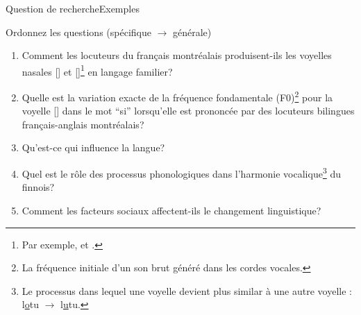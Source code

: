 \documentclass[xcolor=dvipsnames, mathserif, 10pt, aspectratio=169, handout]{beamer}
\begin{document}

\begin{frame}[t]{Question de recherche}{Exemples}

\footnotesize

\begin{importanttitle}{Ordonnez les questions (spécifique $\rightarrow$ générale)}
	

\begin{enumerate}
    \item[A.] Comment les locuteurs du français montréalais produisent-ils les voyelles nasales [] et []\footnote{Par exemple,  et .} en langage familier?
    
    \item[B.] Quelle est la variation exacte de la fréquence fondamentale (F0)\footnote{La fréquence initiale d'un son brut généré dans les cordes vocales.} pour la voyelle [] dans le mot ``si'' lorsqu'elle est prononcée par des locuteurs bilingues français-anglais montréalais?

    \item[C.] Qu'est-ce qui influence la langue?
    
    \item[D.] Quel est le rôle des processus phonologiques dans l'harmonie vocalique\footnote{Le processus dans lequel une voyelle devient plus similar à une autre voyelle : l\underline{o}tu $\rightarrow$ l\underline{u}tu.} du finnois?

    \item[E.] Comment les facteurs sociaux affectent-ils le changement linguistique?
\end{enumerate}
\end{importanttitle}

	
\end{frame}
\end{document}
